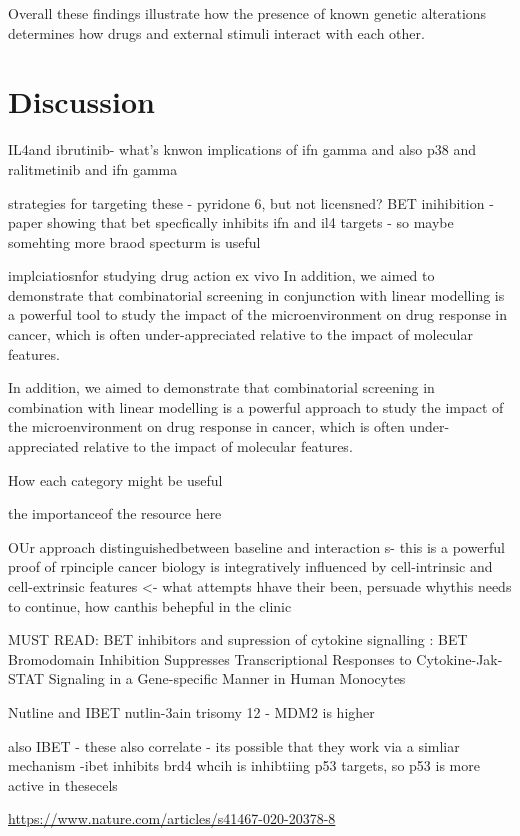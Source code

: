 \documentclass[11pt, a4paper, twosided]{book}
\begin{document}
Overall these findings illustrate how the presence of known genetic alterations determines how drugs and external stimuli interact with each other.

\hypertarget{discussion-1}{%
\section{Discussion}\label{discussion-1}}

IL4and ibrutinib- what's knwon
implications of ifn gamma and also p38 and ralitmetinib and ifn gamma

strategies for targeting these - pyridone 6, but not licensned? BET inihibition - paper showing that bet specfically inhibits ifn and il4 targets - so maybe somehting more braod specturm is useful

implciatiosnfor studying drug action ex vivo
In addition, we aimed to demonstrate that combinatorial screening in conjunction with linear modelling is a powerful tool to study the impact of the microenvironment on drug response in cancer, which is often under-appreciated relative to the impact of molecular features.

In addition, we aimed to demonstrate that combinatorial screening in combination with linear modelling is a powerful approach to study the impact of the microenvironment on drug response in cancer, which is often under-appreciated relative to the impact of molecular features.

How each category might be useful

the importanceof the resource here

OUr approach distinguishedbetween baseline and interaction s- this is a powerful proof of rpinciple
cancer biology is integratively influenced by cell-intrinsic and cell-extrinsic features \textless- what attempts hhave their been, persuade whythis needs to continue, how canthis behepful in the clinic

MUST READ: BET inhibitors and supression of cytokine signalling : BET Bromodomain Inhibition Suppresses Transcriptional Responses to Cytokine-Jak-STAT Signaling in a Gene-specific Manner in Human Monocytes

Nutline and IBET
nutlin-3ain trisomy 12 - MDM2 is higher

also IBET -
these also correlate - its possible that they work via a simliar mechanism -ibet inhibits brd4 whcih is inhibtiing p53 targets, so p53 is more active in thesecels

\url{https://www.nature.com/articles/s41467-020-20378-8}
\end{document}
